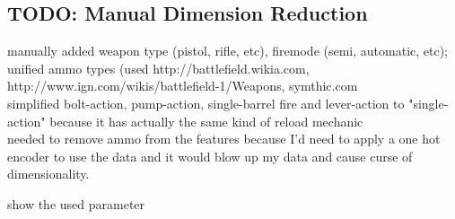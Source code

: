 \documentclass[MGS,Master,english]{twbook}%
\begin{document}
\subsection{TODO: Manual Dimension Reduction}
manually added weapon type (pistol, rifle, etc), firemode (semi, automatic, etc); unified ammo types (used http://battlefield.wikia.com, http://www.ign.com/wikis/battlefield-1/Weapons, symthic.com\\
simplified bolt-action, pump-action, single-barrel fire and lever-action to "single-action" because it has actually the same kind of reload mechanic\\
needed to remove ammo from the features because I'd need to apply a one hot encoder to use the data and it would blow up my data and cause curse of dimensionality.

show the used parameter 
\end{document}
